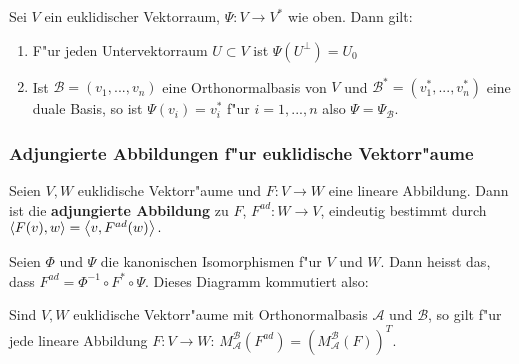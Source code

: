 \documentclass[8pt, a4paper, twocolumn, landscape]{article}
\newcommand{\comment}[1]{}
\begin{document}
\begin{theorem}
Sei $V$ ein euklidischer Vektorraum, $\Psi : V \rightarrow V^*$ wie oben. Dann gilt:
\begin{enumerate}
\item F"ur jeden Untervektorraum $U \subset V$ ist $\Psi(U^\perp) = U_0$
\item Ist $\mathcal{B} = (v_1, ..., v_n)$ eine Orthonormalbasis von $V$ und $\mathcal{B}^* = (v_1^*, ..., v_n^*)$ eine duale Basis, so ist $\Psi(v_i) = v_i^*$ f"ur $i = 1, ..., n$ also $\Psi = \Psi_\mathcal{B}$.
\end{enumerate}
\end{theorem}

\subsubsection{Adjungierte Abbildungen f"ur euklidische Vektorr"aume}


\begin{definition}
Seien $V, W$ euklidische Vektorr"aume und $F : V \rightarrow W$ eine lineare Abbildung. Dann ist die \textbf{adjungierte Abbildung} zu $F$,
$
F^{ad} : W \rightarrow V
$, eindeutig bestimmt  durch
$
\scp{F(v)}{w} = \scp{v}{F^{ad}(w)}.
$
\end{definition}


\begin{remark}
Seien $\Phi$ und $\Psi$ die kanonischen Isomorphismen f"ur $V$ und $W$. Dann heisst das, dass $F^{ad} = 
\Phi^{-1} \circ F^{*} \circ \Psi$.
Dieses Diagramm kommutiert also:
\begin{xy}
\end{xy}

\end{remark}




\begin{remark}
Sind $V, W$ euklidische Vektorr"aume mit Orthonormalbasis $\mathcal{A}$ und $\mathcal{B}$, so gilt f"ur jede lineare Abbildung $F : V \rightarrow W$:
$
M_\mathcal{A}^\mathcal{B}(F^{ad}) = \left( M_\mathcal{A}^\mathcal{B}(F)\right)^T.
$
\end{remark}

\comment{
\begin{remark}
Sei $\mathcal{B}$ eine Orthonormalbasis von $V$, $F$ ein Endomorphismus und $A = M_\mathcal{B}(F)$. Dann ist der adjungierte Endormorphismus von $F$ eindeutig gegeben durch $M_\mathcal{B}(F^{ad}) = A^\dagger$.
\end{remark}
}
\end{document}
